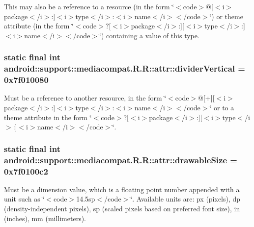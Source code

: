 This may also be a reference to a resource (in the form \char`\"{}$<$code$>$@\mbox{[}$<$i$>$package$<$/i$>$:\mbox{]}$<$i$>$type$<$/i$>$:$<$i$>$name$<$/i$>$$<$/code$>$\char`\"{}) or theme attribute (in the form \char`\"{}$<$code$>$?\mbox{[}$<$i$>$package$<$/i$>$:\mbox{]}\mbox{[}$<$i$>$type$<$/i$>$:\mbox{]}$<$i$>$name$<$/i$>$$<$/code$>$\char`\"{}) containing a value of this type. \hypertarget{classandroid_1_1support_1_1mediacompat_1_1_r_1_1attr_1feeb007fa2222f0f34b38680edb4cd0}{
\subsubsection[{dividerVertical}]{\setlength{\rightskip}{0pt plus 5cm}static final int android::support::mediacompat.R.R::attr::dividerVertical = 0x7f010080}}
\label{classandroid_1_1support_1_1mediacompat_1_1_r_1_1attr_1feeb007fa2222f0f34b38680edb4cd0}


Must be a reference to another resource, in the form \char`\"{}$<$code$>$@\mbox{[}+\mbox{]}\mbox{[}$<$i$>$package$<$/i$>$:\mbox{]}$<$i$>$type$<$/i$>$:$<$i$>$name$<$/i$>$$<$/code$>$\char`\"{} or to a theme attribute in the form \char`\"{}$<$code$>$?\mbox{[}$<$i$>$package$<$/i$>$:\mbox{]}\mbox{[}$<$i$>$type$<$/i$>$:\mbox{]}$<$i$>$name$<$/i$>$$<$/code$>$\char`\"{}. \hypertarget{classandroid_1_1support_1_1mediacompat_1_1_r_1_1attr_d0994f184624446babb98919c421eb1b}{
\subsubsection[{drawableSize}]{\setlength{\rightskip}{0pt plus 5cm}static final int android::support::mediacompat.R.R::attr::drawableSize = 0x7f0100c2}}
\label{classandroid_1_1support_1_1mediacompat_1_1_r_1_1attr_d0994f184624446babb98919c421eb1b}


Must be a dimension value, which is a floating point number appended with a unit such as \char`\"{}$<$code$>$14.5sp$<$/code$>$\char`\"{}. Available units are: px (pixels), dp (density-independent pixels), sp (scaled pixels based on preferred font size), in (inches), mm (millimeters). 

